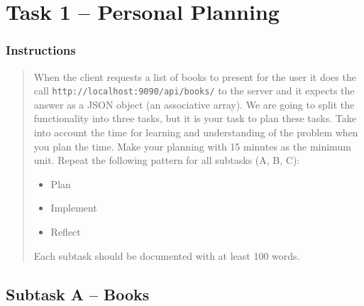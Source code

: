 %
%
%
%


\section{Task 1 -- Personal Planning}

\subsubsection{Instructions}\label{task-1-instructions}

\begin{quote}
  When the client requests a list of books to present for the user it does the
  call \texttt{http://localhost:9090/api/books/} to the server and it expects
  the answer as a JSON object (an associative array). We are going to split the
  functionality into three tasks, but it is your task to plan these tasks. Take
  into account the time for learning and understanding of the problem when you
  plan the time. Make your planning with 15 minutes as the minimum unit. Repeat
  the following pattern for all subtasks (A, B, C):
  
  \begin{itemize}
    \tightlist
    \item Plan
    \item Implement
    \item Reflect
  \end{itemize}
  
  Each subtask should be documented with at least 100 words.
\end{quote}


\subsection{Subtask A -- Books}\label{task-1a}
